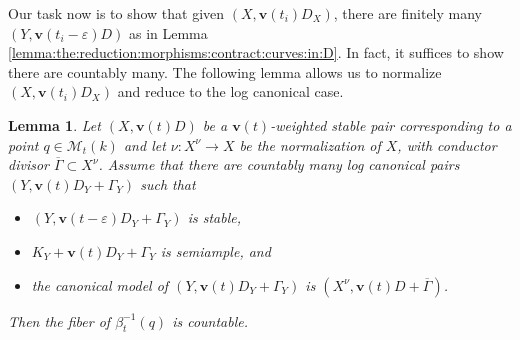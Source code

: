 \documentclass[11pt]{amsart}
\newtheorem{lemma}[theorem]{Lemma}
\theoremstyle{definition}
\theoremstyle{remark}
\newcommand{\calM}{\mathcal M}
\newcommand{\bfv}{\mathbf{v}}
\begin{document}
	Our task now is to show that given $(X, \bfv(t_i)D_X)$, there are finitely many $(Y, \bfv(t_i - \varepsilon)D)$ as in Lemma \ref{lemma:the:reduction:morphisms:contract:curves:in:D}. In fact, it suffices to show there are countably many. The following lemma allows us to normalize $(X, \bfv(t_i)D_X)$ and reduce to the log canonical case. 
	
	\begin{lemma}\label{Lemma:red:lc:case}
		Let $(X,\bfv(t)D)$ be a $\bfv(t)$-weighted stable pair corresponding to a point $q \in \calM_t(k)$ and let $\nu:X^\nu\to X$ be the normalization of $X$, with conductor divisor $\overline{\Gamma} \subset X^\nu$. Assume that there are countably many log canonical  pairs $(Y,\bfv(t)D_Y+\Gamma_Y)$ such that 
		\begin{itemize}
			\item $(Y,\bfv(t-\varepsilon)D_Y+\Gamma_Y)$ is stable, 
			\item $K_Y + \bfv(t) D_Y+\Gamma_Y$ is semiample, and
			\item the canonical model of $(Y,\bfv(t) D_Y+\Gamma_Y)$ is $(X^\nu, \bfv(t)D + \overline{\Gamma})$.
		\end{itemize}
		Then the fiber of $\beta_{t}^{-1}(q)$ is countable.
	\end{lemma}
\end{document}
